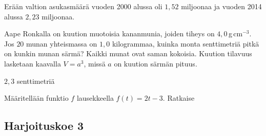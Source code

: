 	\begin{tehtava}
	Erään valtion asukasmäärä vuoden 2000 alussa oli $1,52$ miljoonaa ja vuoden 2014 alussa $2,23$ miljoonaa.

	\begin{vastaus}
	\end{vastaus}
\end{tehtava}

\begin{tehtava}
Aape Ronkalla on kuution muotoisia kananmunia, joiden tiheys on $4,0$\,g\,cm$^{-3}$. Jos $20$ munan yhteismassa on $1,0$ kilogrammaa, kuinka monta senttimetriä pitkä on kunkin munan särmä? Kaikki munat ovat saman kokoisia. Kuution tilavuus lasketaan kaavalla $V=a^3$, missä $a$ on kuution särmän pituus.
	\begin{vastaus}
$2,3$ senttimetriä
	\end{vastaus}
\end{tehtava}
		
	\begin{tehtava}
Määritellään funktio $f$ lausekkeella $f(t) = 2t-3$. Ratkaise
\begin{vastaus}
\end{vastaus}
\end{tehtava}

\newpage

\subsection*{Harjoituskoe 3}

